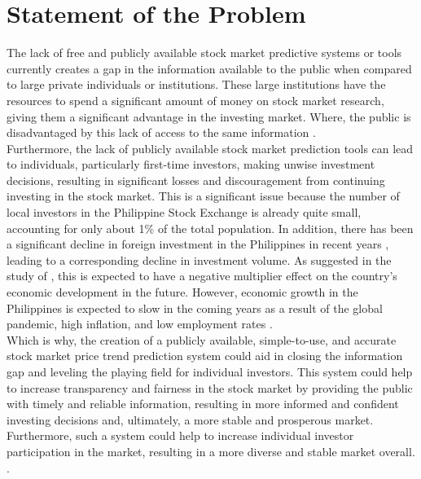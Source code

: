 \section{Statement of the Problem}
\label{sec:problem}
The lack of free and publicly available stock market predictive systems or tools 
currently creates a gap in the information available to the public when compared 
to large private individuals or institutions. These large institutions have the 
resources to spend a significant amount of money on stock market research, giving 
them a significant advantage in the investing market. Where, the public is 
disadvantaged by this lack of access to the same information
\cite{Kim2022}. 
\hfill \\
 
Furthermore, the lack of publicly available stock market prediction tools can lead 
to individuals, particularly first-time investors, making unwise investment decisions, 
resulting in significant losses and discouragement from continuing investing in the stock market. 
This is a significant issue because the number of local investors in the Philippine 
Stock Exchange is already quite small, accounting for only about 1\% of the total 
population. In addition, there has been a significant decline in foreign investment 
in the Philippines in recent years \cite{BusinessWorld2022}, 
leading to a corresponding decline in investment volume. 
As suggested in the study of , 
this is expected to have a negative multiplier effect on the country's 
economic development in the future. However, economic growth in the 
Philippines is expected to slow in the coming years as a 
result of the global pandemic, high inflation, and low employment rates
\cite{Alegado2022,Canto2022,Reuters2022}.
\hfill \\
 
Which is why, the creation of a publicly available, simple-to-use, and accurate 
stock market price trend prediction system could aid in closing the information 
gap and leveling the playing field for individual investors. This system could 
help to increase transparency and fairness in the stock market by providing the 
public with timely and reliable information, resulting in more informed and 
confident investing decisions and, ultimately, a more stable and prosperous market. 
Furthermore, such a system could help to increase individual investor participation 
in the market, resulting in a more diverse and stable market overall.
\cite{Statista2022,POPCOMM2021}.
\hfill \\

